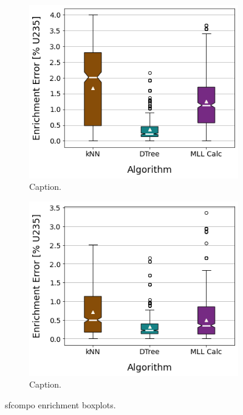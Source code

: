 \begin{figure}[!ht]
    \centering
    \begin{subfigure}[b]{0.49\textwidth}
        \centering
        \includegraphics[width=\textwidth]{./chapters/exp1/sfcompo_boxplots_0null_enri.png}
        \caption[]{Caption.}
    \end{subfigure}
    \hfill
    \begin{subfigure}[b]{0.49\textwidth}
        \centering
        \includegraphics[width=\textwidth]{./chapters/exp1/sfcompo_boxplots_impnull_enri.png}
        \caption[]{Caption.}
    \end{subfigure}
    \caption{sfcompo enrichment boxplots.}
    \label{fig:sfcoenri}
\end{figure}

